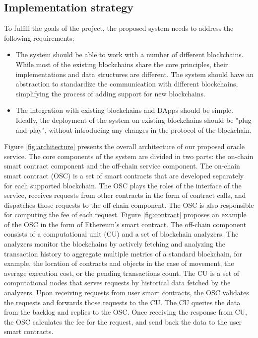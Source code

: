 \subsection{Implementation strategy}
\label{sec:strategy}

To fulfill the goals of the project, the proposed system needs to address
the following requirements:
\begin{itemize}
      \item The system should be able to work with a number of different
      blockchains. While most of the existing blockchains share the core
      principles, their implementations and data structures are different. The
      system should have an abstraction to standardize the communication
      with different blockchains, simplifying the process of adding support for
      new blockchains.
      \item The integration with existing blockchains and DApps should be
      simple. Ideally, the deployment of the system on existing blockchains
      should be "plug-and-play", without introducing any changes in the
      protocol of the blockchain. 
\end{itemize}

Figure \ref{fig:architecture} presents the overall architecture of our proposed
oracle service. The core components of the system are divided in two parts: the
on-chain smart contract component and the off-chain service component. The
on-chain smart contract (OSC) is a set of smart contracts that are developed
separately for each supported blockchain. The OSC plays the roles of the
interface of the service, receives requests from other contracts in the form of
contract calls, and dispatches those requests to the off-chain component. The
OSC is also responsible for computing the fee of each request. Figure
\ref{fig:contract} proposes an example of the OSC in the form of Ethereum's
smart contract. The off-chain component consists of a computational unit (CU)
and a set of blockchain analyzers. The analyzers monitor the blockchains by
actively fetching and analyzing the transaction history to aggregate multiple
metrics of a standard blockchain, for example, the location of contracts and
objects in the case of movement, the average execution cost, or the pending
transactions count. The CU is a set of computational nodes that serves requests
by historical data fetched by the analyzers. Upon receiving requests from user
smart contracts, the OSC validates the requests and forwards those requests to
the CU. The CU queries the data from the backlog and replies to the OSC. Once
receiving the response from CU, the OSC calculates the fee for the request, and
send back the data to the user smart contracts.

